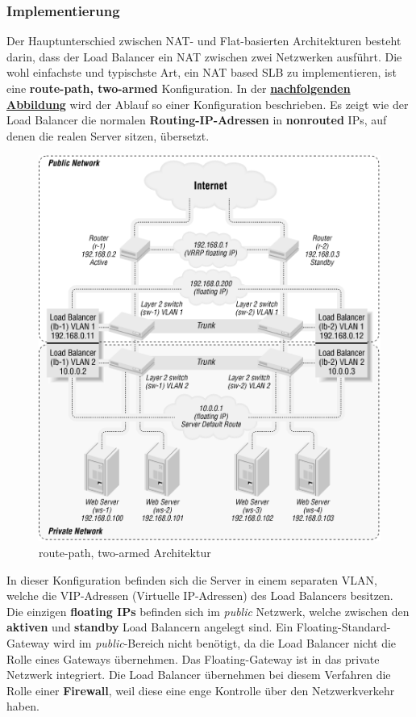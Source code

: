 \subsubsection{Implementierung}
Der Hauptunterschied zwischen NAT- und Flat-basierten Architekturen besteht darin, dass der Load Balancer ein NAT zwischen zwei Netzwerken ausführt. Die wohl einfachste und typischste Art, ein NAT based SLB zu implementieren, ist eine 
\textbf{route-path, two-armed} Konfiguration. In der \textbf{\hyperref[nat_slb_01]{nachfolgenden Abbildung}} wird der Ablauf so einer Konfiguration beschrieben. Es zeigt wie der Load Balancer die normalen \textbf{Routing-IP-Adressen} in \textbf{nonrouted} IPs, auf denen die realen Server sitzen, übersetzt.
\begin{figure}[!h]
	\begin{center}
		\includegraphics[width=0.5\linewidth]{images/slb_0701}
		\caption{route-path, two-armed Architektur}
		\label{nat_slb_01}
	\end{center}
\end{figure}
\newline
In dieser Konfiguration befinden sich die Server in einem separaten VLAN, welche die VIP-Adressen (Virtuelle IP-Adressen) des Load Balancers besitzen. Die einzigen \textbf{floating IPs} befinden sich im \textit{public} Netzwerk, welche zwischen den \textbf{aktiven} und \textbf{standby} Load Balancern angelegt sind. Ein Floating-Standard-Gateway wird im \textit{public}-Bereich nicht benötigt, da die Load Balancer nicht die Rolle eines Gateways übernehmen. Das Floating-Gateway ist in das private Netzwerk integriert. Die Load Balancer übernehmen bei diesem Verfahren die Rolle einer \textbf{Firewall}, weil diese eine enge Kontrolle über den Netzwerkverkehr haben.

